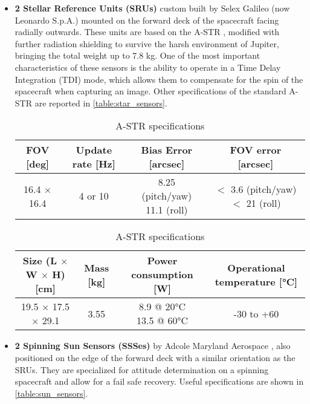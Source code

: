 \begin{itemize}
    \item \textbf{2 Stellar Reference Units (SRUs)} custom built by Selex Galileo (now Leonardo S.p.A.) mounted on the forward deck of the spacecraft facing radially outwards. These units are based on the A-STR \cite{SRU}, modified with further radiation shielding to survive the harsh environment of Jupiter, bringing the total weight up to 7.8 kg. One of the most important characteristics of these sensors is the ability to operate in a Time Delay Integration (TDI) mode, which allows them to compensate for the spin of the spacecraft when capturing an image. Other specifications of the standard A-STR are reported in \autoref{table:star_sensors}.
    \begin{table}[H]
        \renewcommand{\arraystretch}{1.3}
        \centering
        \begin{tabular}{|c|c|c|c|}
            \hline
            \textbf{FOV [deg]} & \textbf{Update rate [Hz]} & \textbf{Bias Error [arcsec]} & \textbf{FOV error [arcsec]} \\
            \hline
            \hline
            16.4 $\times$ 16.4 & 4 or 10 & \makecell{8.25 (pitch/yaw) \\ 11.1 (roll)} & \makecell{$<$ 3.6 (pitch/yaw) \\ $<$ 21 (roll)} \\   
            \hline
        \end{tabular}

        \vspace{5mm}

        \begin{tabular}{|c|c|c|c|}
            \hline
            \textbf{Size (L $\boldsymbol{\times}$ W $\boldsymbol{\times}$ H) [cm]} & \textbf{Mass [kg]} & \textbf{Power consumption [W]} & \textbf{Operational temperature [°C]} \\
            \hline
            \hline
            19.5 $\times$ 17.5 $\times$ 29.1 & 3.55 & \makecell{8.9 @ 20°C \\ 13.5 @ 60°C} & -30 to +60\\
            \hline
        \end{tabular}
        \caption{A-STR specifications}
        \label{table:star_sensors}
    \end{table}
 
    \item \textbf{2 Spinning Sun Sensors (SSSes)} by Adcole Maryland Aerospace \cite{SSS}, also positioned on the edge of the forward deck with a similar orientation as the SRUs. They are specialized for attitude determination on a spinning spacecraft and allow for a fail safe recovery. Useful specifications are shown in \autoref{table:sun_sensors}.
    

\end{itemize}
